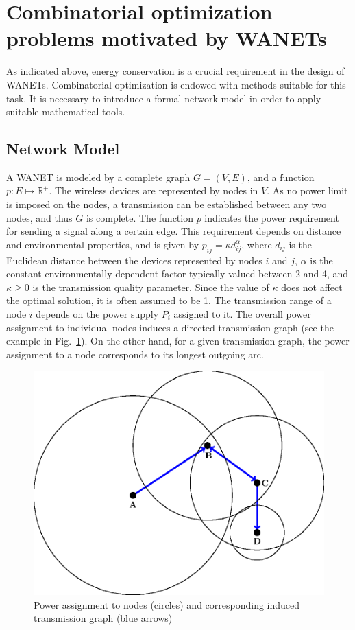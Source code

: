 \section{Combinatorial optimization problems motivated by WANETs}

As indicated above, energy conservation is a crucial requirement in the design of WANETs. 
Combinatorial optimization is endowed with methods suitable for this task. 
It is necessary to introduce a formal network model in order to apply suitable mathematical tools.

\subsection{Network Model}

A WANET is modeled by a complete graph $G=(V,E)$, and a function $p:E\mapsto \mathbb{R}^+$.
The wireless devices are represented by nodes in $V$. 
As no power limit is imposed on the nodes, a transmission can be established between any two nodes, and thus $G$ is complete.
The function $p$ indicates the power requirement for sending a signal along a certain edge.
This requirement depends on distance and environmental properties, and is given by  $p_{ij}=\kappa d_{ij}^\alpha$, 
where $d_{ij}$ is the Euclidean distance between the devices represented by nodes $i$ and $j$, $\alpha$ is the constant environmentally dependent factor typically valued between 2 and 4,
and $\kappa\geq 0$ is the transmission quality parameter. 
Since the value of $\kappa$ does not affect the optimal solution, it is often assumed to be 1.
The transmission range of a node $i$ depends on the power supply $P_i$ assigned to it.
The overall power assignment to individual nodes induces a directed transmission graph (see the example in Fig.~\ref{fig:transgraph}). 
On the other hand, for a given transmission graph, the power assignment to a node corresponds to its longest outgoing arc.
\begin{figure}[htb!]
  \centering
  \includegraphics[scale=.8]{figurer/tran-graph.eps}
  \caption{Power assignment to nodes (circles)  and corresponding induced transmission graph (blue arrows)}
  \label{fig:transgraph}
\end{figure}
